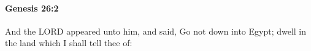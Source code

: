 
		\paragraph{Genesis 26:2} %
			\label{GENESIS-26-2}

			And the LORD appeared unto him, and said, Go not down into Egypt; dwell in the land which I shall tell thee of:


